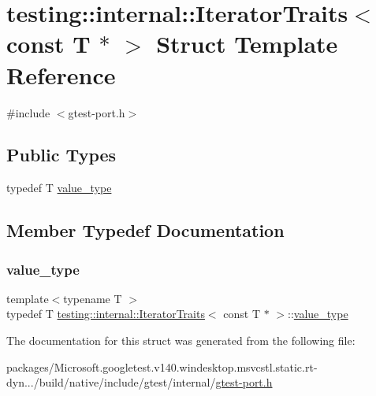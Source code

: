 \hypertarget{structtesting_1_1internal_1_1_iterator_traits_3_01const_01_t_01_5_01_4}{}\section{testing\+::internal\+::Iterator\+Traits$<$ const T $\ast$ $>$ Struct Template Reference}
\label{structtesting_1_1internal_1_1_iterator_traits_3_01const_01_t_01_5_01_4}


{\ttfamily \#include $<$gtest-\/port.\+h$>$}

\subsection*{Public Types}
\begin{DoxyCompactItemize}
\item 
typedef T \mbox{\hyperlink{structtesting_1_1internal_1_1_iterator_traits_3_01const_01_t_01_5_01_4_ae7c8867223e106f374b56a7dc4a85547}{value\+\_\+type}}
\end{DoxyCompactItemize}


\subsection{Member Typedef Documentation}
\mbox{\label{structtesting_1_1internal_1_1_iterator_traits_3_01const_01_t_01_5_01_4_ae7c8867223e106f374b56a7dc4a85547}} 
\subsubsection{\texorpdfstring{value\_type}{value\_type}}
{\footnotesize\ttfamily template$<$typename T $>$ \\
typedef T \mbox{\hyperlink{structtesting_1_1internal_1_1_iterator_traits}{testing\+::internal\+::\+Iterator\+Traits}}$<$ const T $\ast$ $>$\+::\mbox{\hyperlink{structtesting_1_1internal_1_1_iterator_traits_3_01const_01_t_01_5_01_4_ae7c8867223e106f374b56a7dc4a85547}{value\+\_\+type}}}



The documentation for this struct was generated from the following file\+:\begin{DoxyCompactItemize}
\item 
packages/\+Microsoft.\+googletest.\+v140.\+windesktop.\+msvcstl.\+static.\+rt-\/dyn.../build/native/include/gtest/internal/\mbox{\hyperlink{gtest-port_8h}{gtest-\/port.\+h}}\end{DoxyCompactItemize}
